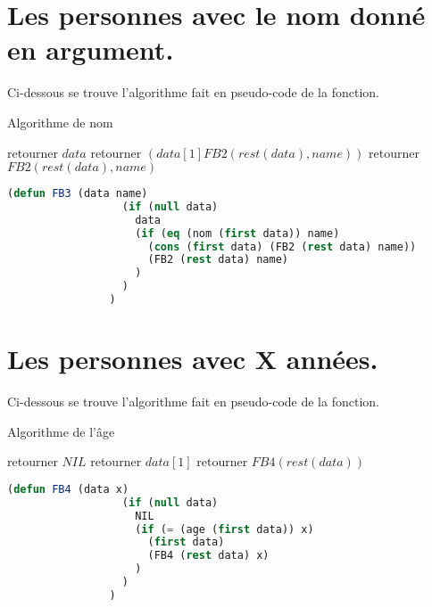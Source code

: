 \documentclass[a4paper, 12pt, leqno]{report}
\theoremstyle{plain}
\begin{document}
           \section{Les personnes avec le nom donné en argument.}
        Ci-dessous se trouve l'algorithme fait en pseudo-code de la fonction.
        \begin{algorithm}
            \caption{Algorithme de nom}
            \begin{algorithmic}
                    \State retourner $data$
                    \State retourner $(data[1] FB2(rest(data), name))$
                \Else
                    \State retourner $FB2(rest (data), name)$    
                \EndIf      
            \end{algorithmic}
            \end{algorithm}
            \begin{lstlisting}[label=some-code,caption=FB3(data name),language=lisp]
                (defun FB3 (data name) 
                  (if (null data) 
                    data 
	                (if (eq (nom (first data)) name) 
	                  (cons (first data) (FB2 (rest data) name)) 
		              (FB2 (rest data) name)
		            )
	              )
                )
            \end{lstlisting} 
            
            \section{Les personnes avec X années.}
        Ci-dessous se trouve l'algorithme fait en pseudo-code de la fonction.
        \begin{algorithm}
            \caption{Algorithme de l'âge}
            \begin{algorithmic}
                    \State retourner $NIL$
                    \State retourner $data[1]$
                \Else
                    \State retourner $FB4(rest (data))$    
                \EndIf      
            \end{algorithmic}
            \end{algorithm}
            \begin{lstlisting}[label=some-code,caption=FB4(data X),language=lisp]
                (defun FB4 (data x) 
                  (if (null data) 
                    NIL
	                (if (= (age (first data)) x) 
	                  (first data) 
	                  (FB4 (rest data) x)
	                )
	              )
                )
            \end{lstlisting} 
            \newpage  
            
\end{document}
